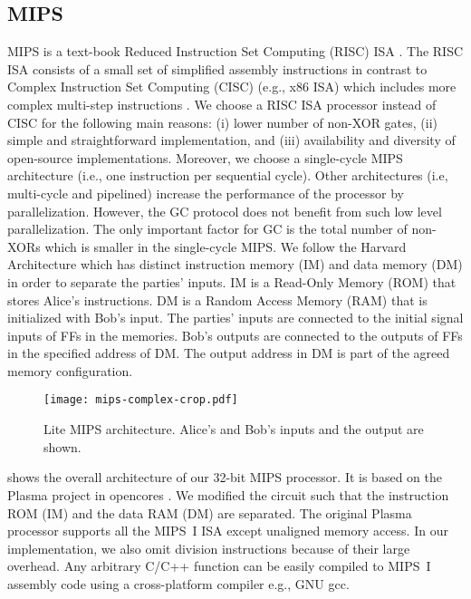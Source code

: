 \subsection{MIPS}
MIPS is a text-book Reduced Instruction Set Computing (RISC) ISA \cite{kane1992mips}.
The RISC ISA consists of a small set of simplified assembly instructions in contrast to Complex Instruction Set Computing (CISC) (e.g., x86 ISA) which includes more complex multi-step instructions \cite{hennessy2012computer}.
We choose a RISC ISA processor instead of CISC for the following main reasons: (i) lower number of non-XOR gates, (ii) simple and straightforward implementation, and (iii) availability and diversity of open-source implementations.
Moreover, we choose a single-cycle MIPS architecture (i.e., one instruction per sequential cycle).
Other architectures (i.e, multi-cycle and pipelined) increase the performance of the processor by parallelization.
However, the GC protocol does not benefit from such low level parallelization.
The only important factor for GC is the total number of non-XORs which is smaller in the single-cycle MIPS.
We follow the Harvard Architecture which has distinct instruction memory (IM) and data memory (DM) in order to separate the parties' inputs.
IM is a Read-Only Memory (ROM) that stores Alice's instructions.
DM is a Random Access Memory (RAM) that is initialized with Bob's input.
The parties' inputs are connected to the initial signal inputs of FFs in the memories.
Bob's outputs are connected to the outputs of FFs in the specified address of DM.
The output address in DM is part of the agreed memory configuration.

\begin{figure}[ht]
\centering
\texttt{[image: mips-complex-crop.pdf]}
\caption{Lite MIPS architecture.
  Alice's and Bob's inputs and the output are shown.}\label{figure:mips}
\end{figure}

 shows the overall architecture of our 32-bit MIPS processor.
It is based on the Plasma project in opencores \cite{rhoads2006plasma}.
We modified the circuit such that the instruction ROM (IM) and the data RAM (DM) are separated.
The original Plasma processor supports all the MIPS~I ISA except unaligned memory access.
In our implementation, we also omit division instructions because of their large overhead.
Any arbitrary C/C++ function can be easily compiled to MIPS~I assembly code using a cross-platform compiler e.g., GNU gcc.

